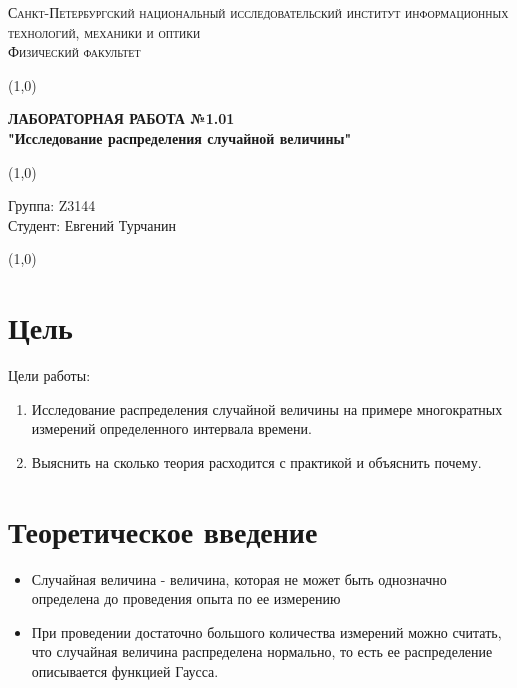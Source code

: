 \documentclass[a4paper]{article}
\begin{document}
\begin{center}
\textsc{Санкт-Петербургский национальный исследовательский институт информационных технологий, механики и оптики\\[3mm]
Физический факультет} \\[3mm]

\end{center}
\vspace{5mm}
\line(1,0){\textwidth}
\begin{center}
\textbf{ЛАБОРАТОРНАЯ РАБОТА №1.01\\}
\textbf{"Исследование распределения случайной величины"}
\end{center}
\vspace{2mm}
\line(1,0){\textwidth}
\vspace{5mm}
\begin{minipage}{0.4\textwidth}
    Группа: Z3144 \\
    Студент: Евгений Турчанин\\
    \vspace{1mm}
\end{minipage}
\hfill
\vspace{1mm}
\line(1,0){\textwidth}


\section{Цель}
Цели работы:
\begin{enumerate}
	\item  Исследование распределения случайной величины на примере многократных измерений определенного интервала времени.
	\item  Выяснить на сколько теория расходится с практикой и объяснить почему.
\end{enumerate}


\section{Теоретическое введение}
\begin{itemize}
	\item Случайная величина - величина, которая не может быть однозначно определена до проведения опыта по ее измерению
	\item При проведении достаточно большого количества измерений можно считать, что случайная величина распределена нормально, то есть ее распределение описывается функцией Гаусса.
\end{itemize}
\end{document}
